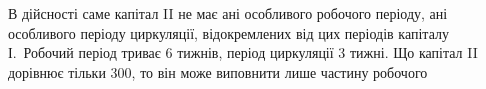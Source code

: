 В дійсності саме капітал II не має ані особливого робочого періоду, ані особливого
періоду циркуляції, відокремлених від цих періодів капіталу І.~Робочий
період триває 6 тижнів, період циркуляції 3 тижні. Що капітал II дорівнює
тільки 300, то він може виповнити лише частину робочого
\parbreak{}  %
